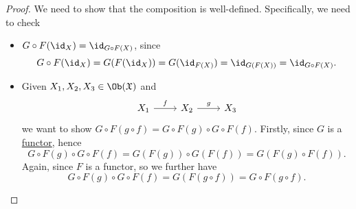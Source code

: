 \begin{proof}
	We need to show that the composition is well-defined. Specifically, we need to check
	\begin{itemize}
		\item \(G\circ F(\id_{X}) = \id_{G\circ F(X)}\), since
		      \[
			      G\circ F(\id_{X} ) = G(F(\id_{X} )) = G(\id_{F(X)}) = \id_{G(F(X))} = \id_{G\circ F(X)}.
		      \]
		\item Given \(X_1, X_2, X_3\in \Ob (\mathfrak{X})\) and
		      \[
			      \begin{tikzcd}
				      {X_1} & {X_2} & {X_3}
				      \arrow["f", from=1-1, to=1-2]
				      \arrow["g", from=1-2, to=1-3]
			      \end{tikzcd}
		      \]
		      we want to show \(G\circ F(g\circ f) = G\circ F(g) \circ G\circ F(f)\). Firstly, since \(G\) is a \hyperref[def:functor]{functor}, hence
		      \[
			      G\circ F(g) \circ G\circ F(f) = G(F(g))	\circ G(F(f)) = G\left(F(g)\circ F(f)\right).
		      \]
		      Again, since \(F\) is a functor, so we further have
		      \[
			      G\circ F(g) \circ G\circ F(f) = G(F(g\circ f)) = G\circ F(g\circ f).
		      \]
	\end{itemize}
\end{proof}

